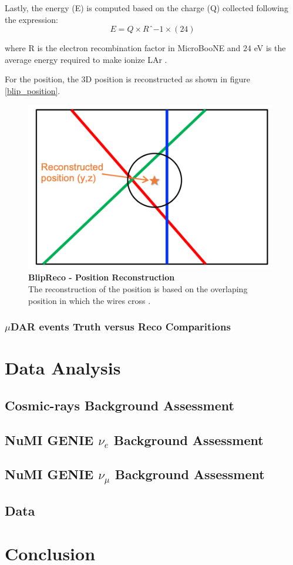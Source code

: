 Lastly, the energy (E) is computed based on the charge (Q) collected following the expression:
\begin{equation}
    E=Q\times Rˆ{-1} \times (24)
\end{equation}

where R is the electron recombination factor in MicroBooNE and $24$ eV is the average energy required to make ionize LAr \cite{lariat_calorimetry_lar}. 

For the position, the 3D position is reconstructed as shown in figure \ref{blip_position}. 

\begin{figure}[h!]
    \centering
    \includegraphics[width=110mm]{Figures/blip_reco_position.png}
    \caption[BlipReco - Position Reconstruction]{{\textbf{BlipReco - Position Reconstruction}}\\ The reconstruction of the position is based on the overlaping position in which the wires cross \cite{will_CM_Aug}.}
    \label{charge_match}
\end{figure}

\subsubsection{$\mu$DAR events Truth versus Reco Comparitions}

\section{Data Analysis}
\subsection{Cosmic-rays Background Assessment}
\subsection{NuMI GENIE $\nu_e$ Background Assessment}
\subsection{NuMI GENIE $\nu_{\mu}$ Background Assessment}
\subsection{Data}
\section{Conclusion}